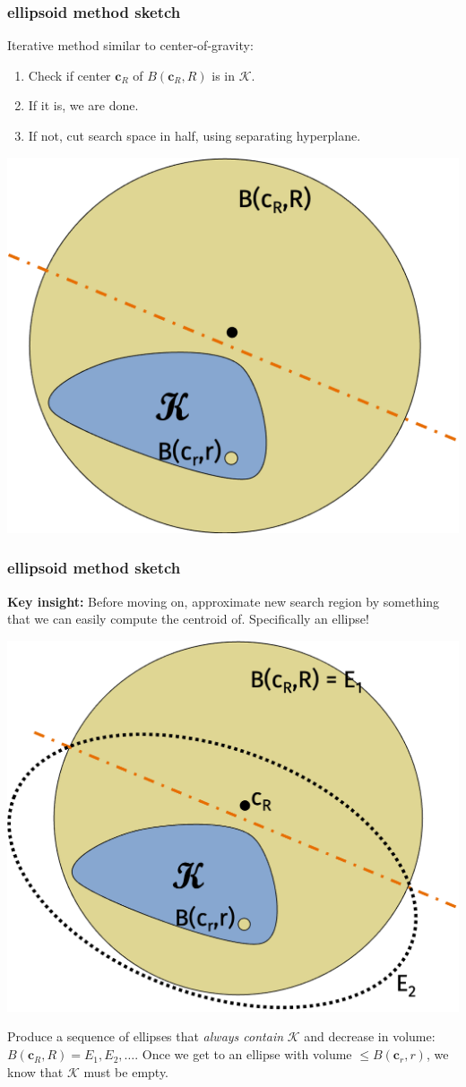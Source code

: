 \documentclass[compress]{beamer}
\newcommand{\bv}[1]{\mathbf{#1}}
\begin{document}
\begin{frame}[t]
	\frametitle{ellipsoid method sketch}
	Iterative method similar to center-of-gravity:
	\begin{enumerate}
		\item Check if center $\bv{c}_R$ of $B(\bv{c}_R, R)$ is in $\mathcal{K}$.
		\item If it is, we are done.
		\item  If not, cut search space in half, using separating hyperplane. 
	\end{enumerate}
	\begin{center}
		\includegraphics[width=.5\textwidth]{ellipsoid1.png}
	\end{center}
\end{frame}

\begin{frame}[t]
	\frametitle{ellipsoid method sketch}
	\textbf{Key insight:} Before moving on, approximate new search region by something that we can easily compute the centroid of. Specifically an ellipse!
	\vspace{-1em}
	\begin{center}
		\includegraphics[width=.5\textwidth]{ellipsoid2.png}
	\end{center}
	\vspace{-1em}
Produce a sequence of ellipses that \emph{always contain} $\mathcal{K}$ and decrease in volume: $B(\bv{c}_R, R) = E_1, E_2, \ldots$. Once we get to an ellipse with volume $\leq B(\bv{c}_r, r)$, we know that $\mathcal{K}$ must be empty.
\end{frame}
\end{document}
